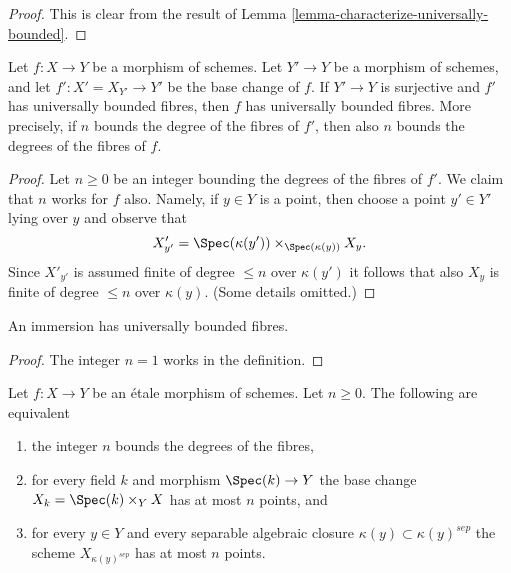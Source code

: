 \begin{proof}
This is clear from the result of
Lemma \ref{lemma-characterize-universally-bounded}.
\end{proof}

\begin{lemma}
\label{lemma-descent-universally-bounded}
Let $f : X \to Y$ be a morphism of schemes.
Let $Y' \to Y$ be a morphism of schemes, and let
$f' : X' = X_{Y'} \to Y'$ be the base change of $f$.
If $Y' \to Y$ is surjective and $f'$ has universally bounded fibres,
then $f$ has universally bounded fibres. More precisely, if $n$ bounds
the degree of the fibres of $f'$, then also $n$ bounds the degrees
of the fibres of $f$.
\end{lemma}

\begin{proof}
Let $n \geq 0$ be an integer bounding the degrees of the fibres of $f'$.
We claim that $n$ works for $f$ also. Namely, if $y \in Y$ is a point,
then choose a point $y' \in Y'$ lying over $y$ and observe that
$$
X'_{y'} = \Spec(\kappa(y')) \times_{\Spec(\kappa(y))} X_y.
$$
Since $X'_{y'}$ is assumed finite of degree $\leq n$ over $\kappa(y')$
it follows that also $X_y$ is finite of degree $\leq n$ over $\kappa(y)$.
(Some details omitted.)
\end{proof}

\begin{lemma}
\label{lemma-immersion-universally-bounded}
An immersion has universally bounded fibres.
\end{lemma}

\begin{proof}
The integer $n = 1$ works in the definition.
\end{proof}

\begin{lemma}
\label{lemma-etale-universally-bounded}
Let $f : X \to Y$ be an \'etale morphism of schemes.
Let $n \geq 0$. The following are equivalent
\begin{enumerate}
\item the integer $n$ bounds the degrees of the fibres,
\item for every field $k$ and morphism $\Spec(k) \to Y$ the
base change $X_k = \Spec(k) \times_Y X$ has at most $n$ points, and
\item for every $y \in Y$ and every separable algebraic closure
$\kappa(y) \subset \kappa(y)^{sep}$ the scheme
$X_{\kappa(y)^{sep}}$ has at most $n$ points.
\end{enumerate}
\end{lemma}


